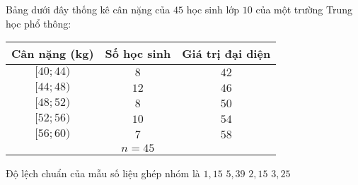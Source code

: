 \begin{ex}%
	Bảng dưới đây thống kê cân nặng của $45$ học sinh lớp $10$ của một trường Trung học phổ thông:
	\begin{center}
		\begin{tabular}{|c|c|c|}
			\hline
			Cân nặng (kg) & Số học sinh & Giá trị đại diện \\
			\hline
			$[40;44)$     & $8$         & $42$             \\
			\hline
			$[44;48)$     & $12$        & $46$             \\
			\hline
			$[48;52)$     & $8$         & $50$             \\
			\hline
			$[52;56)$     & $10$        & $54$             \\
			\hline
			$[56;60)$     & $7$         & $58$             \\
			\hline
			              & $n=45$      &                  \\
			\hline
		\end{tabular}
	\end{center}
	Độ lệch chuẩn của mẫu số liệu ghép nhóm là
	\choice
	{$1{,}15$}
	{\True $5{,}39$}
	{$2{,}15$}
	{$3{,}25$}
\end{ex}
\TL
